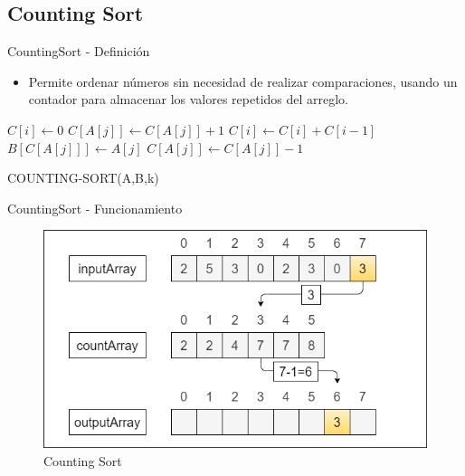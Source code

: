 \documentclass[11pt]{beamer}
\begin{document}
		\subsection{Counting Sort}
		\begin{frame}{CountingSort - Definición}
		     \begin{itemize}
		         \item Permite ordenar números sin necesidad de realizar comparaciones, usando un contador para almacenar los valores repetidos del arreglo.
		     \end{itemize}
		     \begin{algorithm}[H]
                \begin{algorithmic}[1]
                        \STATE $C[i] \gets 0$
                    \ENDFOR
                        \STATE $C[A[j]] \gets C[A[j]] + 1$
                    \ENDFOR
                        \STATE $C[i] \gets C[i] + C[i - 1]$
                    \ENDFOR
                        \STATE $B[C[A[j]]] \gets A[j]$
                        \STATE $C[A[j]] \gets C[A[j]]-1$
                    \ENDFOR
                \end{algorithmic}
                \caption{COUNTING-SORT(A,B,k)}
                \label{alg:counting-sort}
            \end{algorithm}
		\end{frame}
		\begin{frame}{CountingSort - Funcionamiento}
		     \begin{figure}[H]
				\centering
				\includegraphics[scale=0.40]{img/countingsort.png}
				\caption{Counting Sort}
				\label{fig:counting_sort_img1}
			\end{figure}
		\end{frame}
\end{document}
